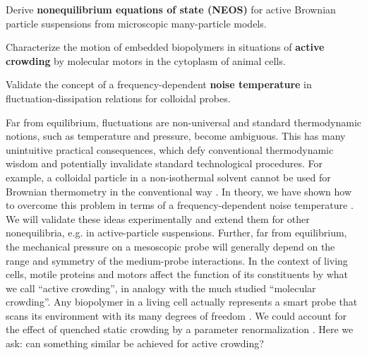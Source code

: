 \begin{workpackage}[id=WPactive,wphases=0-48,
  short=Active Particle Suspensions,%
  title=Probing active particle suspensions with colloids and polymers,
  lead=ULEI,
  ULEIRM=96,UNIPDRM=6,USTUTTRM=2]

\newrefsection

\begin{wpobjectives}
  \begin{compactitem}
  \item Derive \textbf{nonequilibrium equations of state (NEOS)} for active Brownian
  particle suspensions from microscopic many-particle models.
  \item Characterize the motion of embedded biopolymers in situations of \textbf{active
    crowding} by molecular motors in the cytoplasm of animal cells.
  \item Validate the concept of a frequency-dependent \textbf{noise temperature} in
  fluctuation-dissipation relations for colloidal probes.
  \end{compactitem}
\end{wpobjectives}

\begin{wpdescription}

Far from equilibrium, fluctuations are non-universal and standard thermodynamic notions,
such as temperature and pressure, become ambiguous.
This has many unintuitive practical consequences, which defy conventional thermodynamic
wisdom and potentially invalidate standard technological procedures.
%
For example, a colloidal particle in a non-isothermal solvent cannot be used for Brownian thermometry 
in the conventional way \cite{rings-etal:2010,kroy:2014}. In theory, we have shown how to overcome this problem
in terms of a frequency-dependent noise temperature \cite{falasco-etal:2014}.
%
We will validate these ideas experimentally and extend them for other
nonequilibria, e.g. in active-particle suspensions.
%
Further, far from equilibrium, the mechanical pressure on a mesoscopic probe will generally depend on the range and 
symmetry of the medium-probe interactions. 
%
In the context of living cells, motile proteins and motors affect the function
of its constituents by what  we call ``active crowding'', in analogy with the much studied ``molecular crowding''. 
%
Any biopolymer in a living cell actually represents a smart probe that scans its environment with its many 
degrees of freedom \cite{otto-etal:2013}.
%
We could account for the effect of quenched static crowding by a parameter renormalization \cite{schoebl-etal:2014}.  
%
Here we ask: can something similar be achieved for active crowding?
\end{wpdescription}


\end{workpackage}
